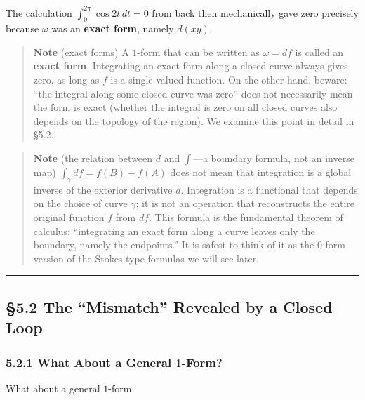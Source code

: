 The calculation \(\int_0^{2\pi} \cos 2t\,dt = 0\) from back then
mechanically gave zero precisely because \(\omega\) was an
\textbf{exact form}, namely \(d(xy)\).

\begin{quote}
\textbf{Note} (exact forms) A \(1\)-form that can be written as
\(\omega = df\) is called an \textbf{exact form}. Integrating an exact
form along a closed curve always gives zero, as long as \(f\) is a
single-valued function. On the other hand, beware: ``the integral along
some closed curve was zero'' does not necessarily mean the form is exact
(whether the integral is zero on all closed curves also depends on the
topology of the region). We examine this point in detail in §5.2.
\end{quote}

\begin{quote}
\textbf{Note} (the relation between \(d\) and \(\int\)---a boundary
formula, not an inverse map) \(\int_\gamma df = f(B)-f(A)\) does not
mean that integration is a global inverse of the exterior derivative
\(d\). Integration is a functional that depends on the choice of curve
\(\gamma\); it is not an operation that reconstructs the entire original
function \(f\) from \(df\). This formula is the fundamental theorem of
calculus: ``integrating an exact form along a curve leaves only the
boundary, namely the endpoints.'' It is safest to think of it as the
\(0\)-form version of the Stokes-type formulas we will see later.
\end{quote}

\begin{center}\rule{0.5\linewidth}{0.5pt}\end{center}

\hypertarget{the-mismatch-revealed-by-a-closed-loop}{%
\subsection{§5.2 The ``Mismatch'' Revealed by a Closed
Loop}\label{the-mismatch-revealed-by-a-closed-loop}}

\hypertarget{what-about-a-general-1-form}{%
\subsubsection{\texorpdfstring{5.2.1 What About a General
\(1\)-Form?}{5.2.1 What About a General 1-Form?}}\label{what-about-a-general-1-form}}

What about a general \(1\)-form

